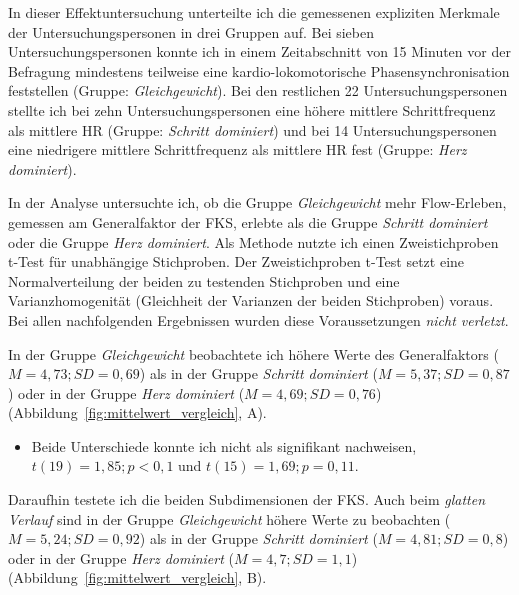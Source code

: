 \label{ssub:effekt_der_physiologisch_gemessenen_afp}

In dieser Effektuntersuchung unterteilte ich die gemessenen expliziten Merkmale der Untersuchungspersonen in drei Gruppen auf. Bei sieben Untersuchungspersonen konnte ich in einem Zeitabschnitt von 15 Minuten vor der Befragung mindestens teilweise eine kardio-lokomotorische Phasensynchronisation feststellen (Gruppe: \emph{Gleichgewicht}). Bei den restlichen 22 Untersuchungspersonen stellte ich bei zehn Untersuchungspersonen eine höhere mittlere Schrittfrequenz als mittlere \ac{HR} (Gruppe: \emph{Schritt dominiert}) und bei 14 Untersuchungspersonen eine niedrigere mittlere Schrittfrequenz als mittlere \ac{HR} fest (Gruppe: \emph{Herz dominiert}).

In der Analyse untersuchte ich, ob die Gruppe \emph{Gleichgewicht} mehr Flow-Erleben, gemessen am Generalfaktor der \ac{FKS}, erlebte als die Gruppe \emph{Schritt dominiert} oder die Gruppe \emph{Herz dominiert}. Als Methode nutzte ich einen Zweistichproben t-Test für unabhängige Stichproben. Der Zweistichproben t-Test setzt eine Normalverteilung der beiden zu testenden Stichproben und eine Varianzhomogenität (Gleichheit der Varianzen der beiden Stichproben) voraus. Bei allen nachfolgenden Ergebnissen wurden diese Voraussetzungen \emph{nicht verletzt}. 

In der Gruppe \emph{Gleichgewicht} beobachtete ich höhere Werte des Generalfaktors ($M = 4{,}73; SD = 0{,}69$) als in der Gruppe \emph{Schritt dominiert} ($M = 5{,}37; SD = 0{,}87$) oder in der Gruppe \emph{Herz dominiert} ($M = 4{,}69; SD = 0{,}76$) (Abbildung~\ref{fig:mittelwert_vergleich}, A). 
\begin{itemize}
	
	\item Beide Unterschiede konnte ich nicht als signifikant nachweisen, $t(19) = 1{,}85; p < 0{,}1$ und $t(15) = 1{,}69; p = 0{,}11$.
\end{itemize}

Daraufhin testete ich die beiden Subdimensionen der \ac{FKS}. Auch beim \emph{glatten Verlauf} sind in der Gruppe \emph{Gleichgewicht} höhere Werte zu beobachten ($M = 5{,}24; SD = 0{,}92$) als in der Gruppe \emph{Schritt dominiert} ($M = 4{,}81; SD = 0{,}8$) oder in der Gruppe \emph{Herz dominiert} ($M = 4{,}7; SD = 1{,}1$) (Abbildung~\ref{fig:mittelwert_vergleich}, B). 

